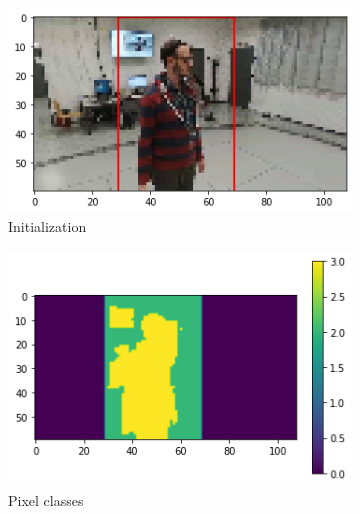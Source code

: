 \begin{figure}[!h]
	\begin{center}
		\begin{subfigure}[h]{0.32\textwidth}
			\centering
			\includegraphics[width=1\textwidth]{"contents/images/04-2grabcut-1rect-steps-1"}
			\caption[]{Initialization}
			\label{fig:grabcut-rect-explain-1}
		\end{subfigure}
		\hfill
		\begin{subfigure}[h]{0.32\textwidth}
			\centering
			\includegraphics[width=1\textwidth]{"contents/images/04-2grabcut-1rect-steps-2"}
			\caption[]{Pixel classes}
			\label{fig:grabcut-rect-explain-2}
		\end{subfigure}
		\hfill
		\begin{subfigure}[h]{0.32\textwidth}
			\centering

\end{subfigure}
\end{center}
\end{figure}
